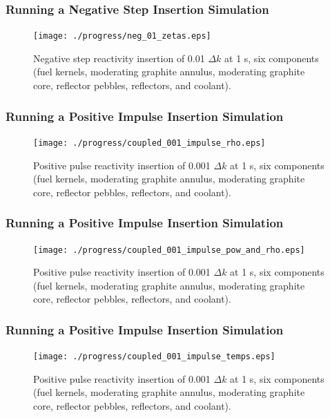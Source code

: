 \begin{frame}[fragile]
\frametitle{Running a Negative Step Insertion Simulation}
  \begin{figure}[htbp!]
    \begin{center}
      \texttt{[image: ./progress/neg\_01\_zetas.eps]}
    \end{center}
    \caption{Negative step reactivity insertion of 0.01 $\Delta k$ at 1 s, six components (fuel kernels, moderating graphite annulus, moderating graphite core, reflector pebbles, reflectors, and coolant).}
    \label{fig:all_comps_temps}
  \end{figure}
\end{frame}


\begin{frame}[fragile]
\frametitle{Running a Positive Impulse Insertion Simulation}
  \begin{figure}[htbp!]
    \begin{center}
      \texttt{[image: ./progress/coupled\_001\_impulse\_rho.eps]}
    \end{center}
    \caption{Positive pulse reactivity insertion of 0.001 $\Delta k$ at 1 s, six components (fuel kernels, moderating graphite annulus, moderating graphite core, reflector pebbles, reflectors, and coolant).}
    \label{fig:all_comps_temps}
  \end{figure}
\end{frame}


\begin{frame}[fragile]
\frametitle{Running a Positive Impulse Insertion Simulation}
  \begin{figure}[htbp!]
    \begin{center}
      \texttt{[image: ./progress/coupled\_001\_impulse\_pow\_and\_rho.eps]}
    \end{center}
    \caption{Positive pulse reactivity insertion of 0.001 $\Delta k$ at 1 s, six components (fuel kernels, moderating graphite annulus, moderating graphite core, reflector pebbles, reflectors, and coolant).}
    \label{fig:all_comps_temps}
  \end{figure}
\end{frame}


\begin{frame}[fragile]
\frametitle{Running a Positive Impulse Insertion Simulation}
  \begin{figure}[htbp!]
    \begin{center}
      \texttt{[image: ./progress/coupled\_001\_impulse\_temps.eps]}
    \end{center}
    \caption{Positive pulse reactivity insertion of 0.001 $\Delta k$ at 1 s, six components (fuel kernels, moderating graphite annulus, moderating graphite core, reflector pebbles, reflectors, and coolant).}
    \label{fig:all_comps_temps}
  \end{figure}
\end{frame}



